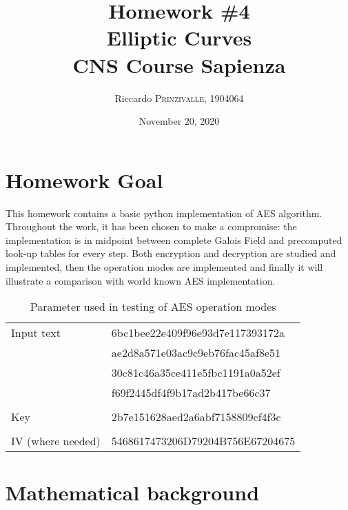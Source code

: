 \documentclass{article}
\title{Homework \#4 \\Elliptic Curves \\[0.2em]\small{}CNS Course Sapienza} %
\author{Riccardo \textsc{Prinzivalle}, 1904064} %
\date{November 20, 2020} %
\begin{document}
\maketitle %


\section{Homework Goal}

This homework contains a basic python implementation of AES algorithm. Throughout the work, it has been chosen to make a compromise: the implementation is in midpoint between complete Galois Field and precomputed look-up tables for every step. Both encryption and decryption are studied and implemented, then the operation modes are implemented and finally it will illustrate a comparison with world known AES implementation.

\begin{table}[H]
\begin{center}
\begin{tabular}{ll}
Input text &  6bc1bee22e409f96e93d7e117393172a\\
	      &   ae2d8a571e03ac9c9eb76fac45af8e51\\
	      &   30c81c46a35ce411e5fbc1191a0a52ef\\
	      &   f69f2445df4f9b17ad2b417be66c37 \\
\\
Key & 2b7e151628aed2a6abf7158809cf4f3c\\
\\
IV (where needed) & 5468617473206D79204B756E67204675
\end{tabular}
\caption{Parameter used in testing of AES operation modes}
\label{tab:AESparameter}
\end{center}
\end{table}


\section{Mathematical background}
 
\end{document}
